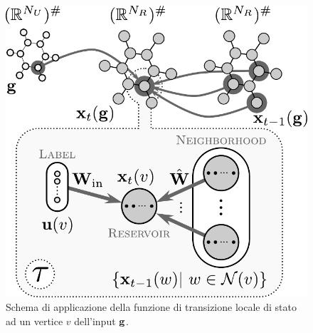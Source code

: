 \begin{figure}[tbp]
\centering
\includegraphics[width=0.6\columnwidth]{img/GraphESN-reservoir-application}
\medskip
\caption[Funzione di transizione locale di stato]{Schema di applicazione della funzione di transizione locale di stato ad un vertice $v$ dell'input $\mathbf{g}$.}
\label{fig:intro:encoding-step}
\end{figure}

